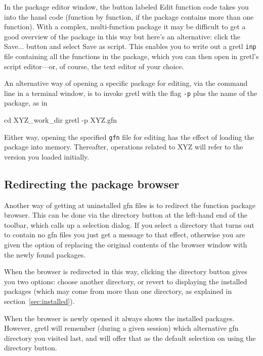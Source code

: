 \documentclass[oneside]{book}
\begin{document}
In the package editor window, the button labeled \textsf{Edit function
  code} takes you into the hansl code (function by function, if the
package contains more than one function). With a complex,
multi-function package it may be difficult to get a good overview of
the package in this way but here's an alternative: click the
\textsf{Save...} button and select \textsf{Save as script}. This
enables you to write out a gretl \texttt{inp} file containing all the
functions in the package, which you can then open in gretl's script
editor---or, of course, the text editor of your choice.

An alternative way of opening a specific package for editing, via the
command line in a terminal window, is to invoke gretl with the flag
\texttt{-p} plus the name of the package, as in
%
\begin{code}
cd XYZ_work_dir
gretl -p XYZ.gfn
\end{code}
%
Either way, opening the specified \texttt{gfn} file for editing has
the effect of loading the package into memory. Thereafter, operations
related to \textsf{XYZ} will refer to the version you loaded
initially.

\subsection{Redirecting the package browser}

Another way of getting at uninstalled \textsf{gfn} files is to
redirect the function package browser. This can be done via the
directory button at the left-hand end of the toolbar, which calls up a
selection dialog. If you select a directory that turns out to contain
no \textsf{gfn} files you just get a message to that effect, otherwise
you are given the option of replacing the original contents of the
browser window with the newly found packages.

When the browser is redirected in this way, clicking the directory
button gives you two options: choose another directory, or revert to
displaying the installed packages (which may come from more than one
directory, as explained in section~\ref{sec:installed}).

When the browser is newly opened it always shows the installed
packages. However, gretl will remember (during a given session) which
alternative \textsf{gfn} directory you visited last, and will offer
that as the default selection on using the directory button.

\end{document}
